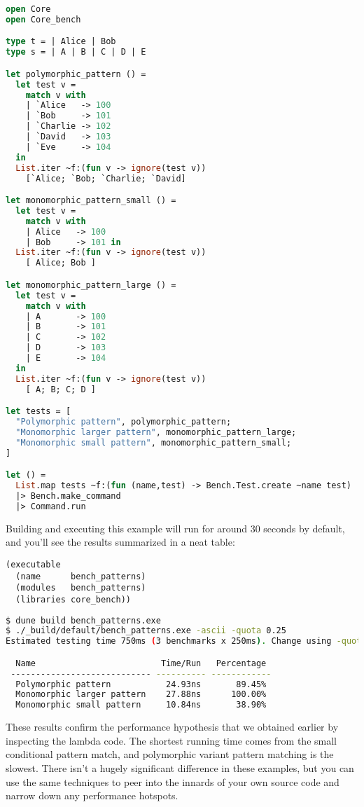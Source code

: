 \begin{lstlisting}[language=Caml]
open Core
open Core_bench

type t = | Alice | Bob
type s = | A | B | C | D | E

let polymorphic_pattern () =
  let test v =
    match v with
    | `Alice   -> 100
    | `Bob     -> 101
    | `Charlie -> 102
    | `David   -> 103
    | `Eve     -> 104
  in
  List.iter ~f:(fun v -> ignore(test v))
    [`Alice; `Bob; `Charlie; `David]

let monomorphic_pattern_small () =
  let test v =
    match v with
    | Alice   -> 100
    | Bob     -> 101 in
  List.iter ~f:(fun v -> ignore(test v))
    [ Alice; Bob ]

let monomorphic_pattern_large () =
  let test v =
    match v with
    | A       -> 100
    | B       -> 101
    | C       -> 102
    | D       -> 103
    | E       -> 104
  in
  List.iter ~f:(fun v -> ignore(test v))
    [ A; B; C; D ]

let tests = [
  "Polymorphic pattern", polymorphic_pattern;
  "Monomorphic larger pattern", monomorphic_pattern_large;
  "Monomorphic small pattern", monomorphic_pattern_small;
]

let () =
  List.map tests ~f:(fun (name,test) -> Bench.Test.create ~name test)
  |> Bench.make_command
  |> Command.run
\end{lstlisting}

Building and executing this example will run for around 30 seconds by
default, and you'll see the results summarized in a neat table:

\begin{lstlisting}
(executable
  (name      bench_patterns)
  (modules   bench_patterns)
  (libraries core_bench))
\end{lstlisting}

\begin{lstlisting}[language=bash]
$ dune build bench_patterns.exe
$ ./_build/default/bench_patterns.exe -ascii -quota 0.25
Estimated testing time 750ms (3 benchmarks x 250ms). Change using -quota SECS.

  Name                         Time/Run   Percentage
 ---------------------------- ---------- ------------
  Polymorphic pattern           24.93ns       89.45%
  Monomorphic larger pattern    27.88ns      100.00%
  Monomorphic small pattern     10.84ns       38.90%
\end{lstlisting}

These results confirm the performance hypothesis that we obtained
earlier by inspecting the lambda code. The shortest running time comes
from the small conditional pattern match, and polymorphic variant
pattern matching is the slowest. There isn't a hugely significant
difference in these examples, but you can use the same techniques to
peer into the innards of your own source code and narrow down any
performance hotspots.

